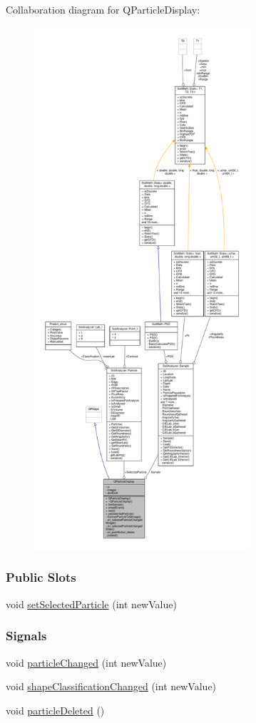 Collaboration diagram for Q\+Particle\+Display\+:
\nopagebreak
\begin{figure}[H]
\begin{center}
\leavevmode
\includegraphics[height=550pt]{class_q_particle_display__coll__graph}
\end{center}
\end{figure}
\subsubsection*{Public Slots}
\begin{DoxyCompactItemize}
\item 
void \hyperlink{class_q_particle_display_a2b6454aa1ddef3eca338780f66b91654}{set\+Selected\+Particle} (int new\+Value)
\end{DoxyCompactItemize}
\subsubsection*{Signals}
\begin{DoxyCompactItemize}
\item 
void \hyperlink{class_q_particle_display_a0418875b751dfe3e15771b994f4293ad}{particle\+Changed} (int new\+Value)
\item 
void \hyperlink{class_q_particle_display_a73adb2e0e1981fc6042d2e94a6e3be03}{shape\+Classification\+Changed} (int new\+Value)
\item 
void \hyperlink{class_q_particle_display_a5a3d6ec47c2b43e92d8279ba42c2a997}{particle\+Deleted} ()
\end{DoxyCompactItemize}
